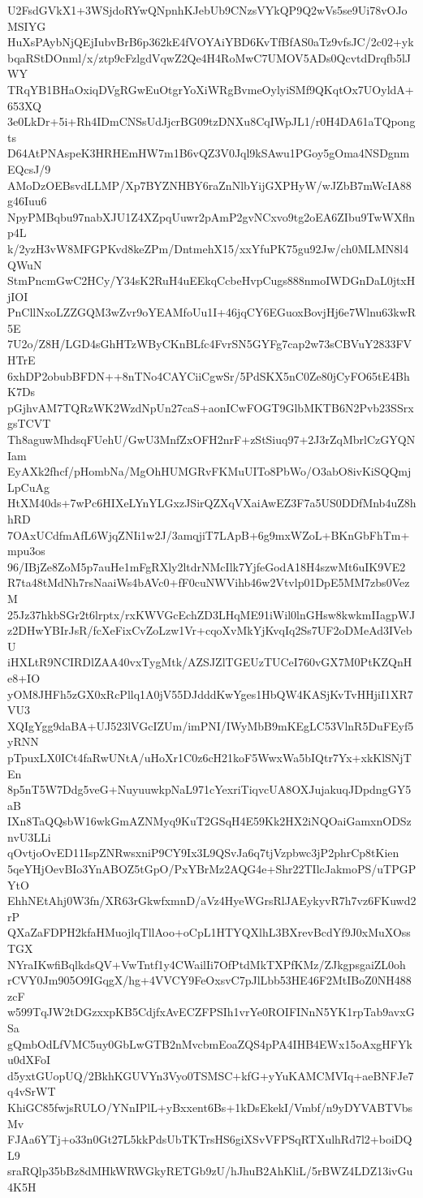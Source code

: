 U2FsdGVkX1+3WSjdoRYwQNpnhKJebUb9CNzsVYkQP9Q2wVs5se9Ui78vOJoMSIYG
HuXsPAybNjQEjIubvBrB6p362kE4fVOYAiYBD6KvTfBfAS0aTz9vfsJC/2c02+yk
bqaRStDOnml/x/ztp9cFzlgdVqwZ2Qe4H4RoMwC7UMOV5ADs0QcvtdDrqfb5lJWY
TRqYB1BHaOxiqDVgRGwEuOtgrYoXiWRgBvmeOylyiSMf9QKqtOx7UOyldA+653XQ
3e0LkDr+5i+Rh4IDmCNSsUdJjcrBG09tzDNXu8CqIWpJL1/r0H4DA61aTQpongts
D64AtPNAspeK3HRHEmHW7m1B6vQZ3V0Jql9kSAwu1PGoy5gOma4NSDgnmEQcsJ/9
AMoDzOEBsvdLLMP/Xp7BYZNHBY6raZnNlbYijGXPHyW/wJZbB7mWcIA88g46Iuu6
NpyPMBqbu97nabXJU1Z4XZpqUuwr2pAmP2gvNCxvo9tg2oEA6ZIbu9TwWXflnp4L
k/2yzH3vW8MFGPKvd8keZPm/DntmehX15/xxYfuPK75gu92Jw/ch0MLMN8l4QWuN
StmPncmGwC2HCy/Y34sK2RuH4uEEkqCcbeHvpCugs888nmoIWDGnDaL0jtxHjIOI
PnCllNxoLZZGQM3wZvr9oYEAMfoUu1I+46jqCY6EGuoxBovjHj6e7Wlnu63kwR5E
7U2o/Z8H/LGD4sGhHTzWByCKnBLfc4FvrSN5GYFg7cap2w73sCBVuY2833FVHTrE
6xhDP2obubBFDN++8nTNo4CAYCiiCgwSr/5PdSKX5nC0Ze80jCyFO65tE4BhK7Ds
pGjhvAM7TQRzWK2WzdNpUn27caS+aonICwFOGT9GlbMKTB6N2Pvb23SSrxgsTCVT
Th8aguwMhdsqFUehU/GwU3MnfZxOFH2nrF+zStSiuq97+2J3rZqMbrlCzGYQNIam
EyAXk2fhcf/pHombNa/MgOhHUMGRvFKMuUITo8PbWo/O3abO8ivKiSQQmjLpCuAg
HtXM40ds+7wPc6HIXeLYnYLGxzJSirQZXqVXaiAwEZ3F7a5US0DDfMnb4uZ8hhRD
7OAxUCdfmAfL6WjqZNIi1w2J/3amqjiT7LApB+6g9mxWZoL+BKnGbFhTm+mpu3os
96/IBjZe8ZoM5p7auHe1mFgRXly2ltdrNMcIlk7YjfeGodA18H4szwMt6uIK9VE2
R7ta48tMdNh7rsNaaiWs4bAVc0+fF0cuNWVihb46w2Vtvlp01DpE5MM7zbs0VezM
25Jz37hkbSGr2t6lrptx/rxKWVGcEchZD3LHqME91iWil0lnGHsw8kwkmIIagpWJ
z2DHwYBIrJsR/fcXeFixCvZoLzw1Vr+cqoXvMkYjKvqIq2Ss7UF2oDMeAd3IVebU
iHXLtR9NCIRDlZAA40vxTygMtk/AZSJZlTGEUzTUCeI760vGX7M0PtKZQnHe8+IO
yOM8JHFh5zGX0xRcPllq1A0jV55DJdddKwYges1HbQW4KASjKvTvHHjiI1XR7VU3
XQIgYgg9daBA+UJ523lVGcIZUm/imPNI/IWyMbB9mKEgLC53VlnR5DuFEyf5yRNN
pTpuxLX0ICt4faRwUNtA/uHoXr1C0z6cH21koF5WwxWa5bIQtr7Yx+xkKlSNjTEn
8p5nT5W7Ddg5veG+NuyuuwkpNaL971cYexriTiqvcUA8OXJujakuqJDpdngGY5aB
IXn8TaQQsbW16wkGmAZNMyq9KuT2GSqH4E59Kk2HX2iNQOaiGamxnODSznvU3LLi
qOvtjoOvED11IspZNRwsxniP9CY9Ix3L9QSvJa6q7tjVzpbwc3jP2phrCp8tKien
5qeYHjOevBIo3YnABOZ5tGpO/PxYBrMz2AQG4e+Shr22TIlcJakmoPS/uTPGPYtO
EhhNEtAhj0W3fn/XR63rGkwfxmnD/aVz4HyeWGrsRlJAEykyvR7h7vz6FKuwd2rP
QXaZaFDPH2kfaHMuojlqTllAoo+oCpL1HTYQXlhL3BXrevBcdYf9J0xMuXOssTGX
NYraIKwfiBqlkdsQV+VwTntf1y4CWailIi7OfPtdMkTXPfKMz/ZJkgpsgaiZL0oh
rCVY0Jm905O9IGqgX/hg+4VVCY9FeOxsvC7pJlLbb53HE46F2MtIBoZ0NH488zcF
w599TqJW2tDGzxxpKB5CdjfxAvECZFPSIh1vrYe0ROIFINnN5YK1rpTab9avxGSa
gQmbOdLfVMC5uy0GbLwGTB2nMvcbmEoaZQS4pPA4IHB4EWx15oAxgHFYku0dXFoI
d5yxtGUopUQ/2BkhKGUVYn3Vyo0TSMSC+kfG+yYuKAMCMVIq+aeBNFJe7q4vSrWT
KhiGC85fwjsRULO/YNnIPlL+yBxxent6Bs+1kDsEkekI/Vmbf/n9yDYVABTVbsMv
FJAa6YTj+o33n0Gt27L5kkPdsUbTKTrsHS6giXSvVFPSqRTXulhRd7l2+boiDQL9
sraRQlp35bBz8dMHkWRWGkyRETGb9zU/hJhuB2AhKliL/5rBWZ4LDZ13ivGu4K5H
